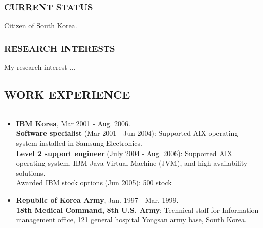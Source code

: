 \documentclass[10pt,a4]{article}
\begin{document}
\begin{small}
\subsubsection*{CURRENT STATUS}
\begin{list}{}{}
\item Citizen of South Korea.
\end{list}

\subsubsection*{RESEARCH INTERESTS}

\begin{list}{}{}
\item My research interest ...
\end{list}

\subsection*{WORK EXPERIENCE}
\hrule
\vspace{0.2cm}
\begin{itemize}
\item {\bf IBM Korea},  Mar 2001 - Aug. 2006.  \\
  {\bf Software specialist} (Mar 2001 - Jun 2004): Supported AIX operating system
  installed in Samsung Electronics. \\
  {\bf Level 2 support engineer} (July 2004 - Aug. 2006): Supported AIX
  operating system, IBM Java Virtual Machine (JVM), and high availability
  solutions. \\
  Awarded IBM stock options (Jun 2005): 500 stock\\
%
\item {\bf Republic of Korea Army}, Jan. 1997 - Mar. 1999. \\
{\bf 18th Medical Command, 8th U.S. Army}: Technical staff for Information
management office, 121 general hospital Yongsan army base, South Korea. \\
%

\end{itemize}


\end{small}
\end{document}
